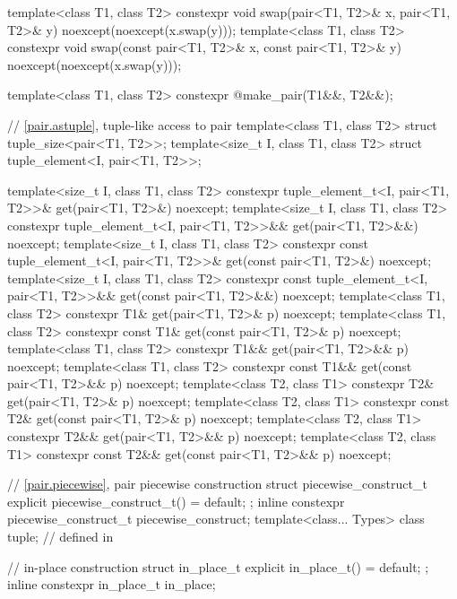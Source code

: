 \begin{codeblock}
{  template<class T1, class T2>
    constexpr void swap(pair<T1, T2>& x, pair<T1, T2>& y) noexcept(noexcept(x.swap(y)));
  template<class T1, class T2>
    constexpr void swap(const pair<T1, T2>& x, const pair<T1, T2>& y)
      noexcept(noexcept(x.swap(y)));

  template<class T1, class T2>
    constexpr @\seebelow@ make_pair(T1&&, T2&&);

  // \ref{pair.astuple}, tuple-like access to pair
  template<class T1, class T2> struct tuple_size<pair<T1, T2>>;
  template<size_t I, class T1, class T2> struct tuple_element<I, pair<T1, T2>>;

  template<size_t I, class T1, class T2>
    constexpr tuple_element_t<I, pair<T1, T2>>& get(pair<T1, T2>&) noexcept;
  template<size_t I, class T1, class T2>
    constexpr tuple_element_t<I, pair<T1, T2>>&& get(pair<T1, T2>&&) noexcept;
  template<size_t I, class T1, class T2>
    constexpr const tuple_element_t<I, pair<T1, T2>>& get(const pair<T1, T2>&) noexcept;
  template<size_t I, class T1, class T2>
    constexpr const tuple_element_t<I, pair<T1, T2>>&& get(const pair<T1, T2>&&) noexcept;
  template<class T1, class T2>
    constexpr T1& get(pair<T1, T2>& p) noexcept;
  template<class T1, class T2>
    constexpr const T1& get(const pair<T1, T2>& p) noexcept;
  template<class T1, class T2>
    constexpr T1&& get(pair<T1, T2>&& p) noexcept;
  template<class T1, class T2>
    constexpr const T1&& get(const pair<T1, T2>&& p) noexcept;
  template<class T2, class T1>
    constexpr T2& get(pair<T1, T2>& p) noexcept;
  template<class T2, class T1>
    constexpr const T2& get(const pair<T1, T2>& p) noexcept;
  template<class T2, class T1>
    constexpr T2&& get(pair<T1, T2>&& p) noexcept;
  template<class T2, class T1>
    constexpr const T2&& get(const pair<T1, T2>&& p) noexcept;

  // \ref{pair.piecewise}, pair piecewise construction
  struct piecewise_construct_t {
    explicit piecewise_construct_t() = default;
  };
  inline constexpr piecewise_construct_t piecewise_construct{};
  template<class... Types> class tuple;         // defined in 

  // in-place construction%
%
%
%
%
%
  struct in_place_t {
    explicit in_place_t() = default;
  };
  inline constexpr in_place_t in_place{};

}
\end{codeblock}
